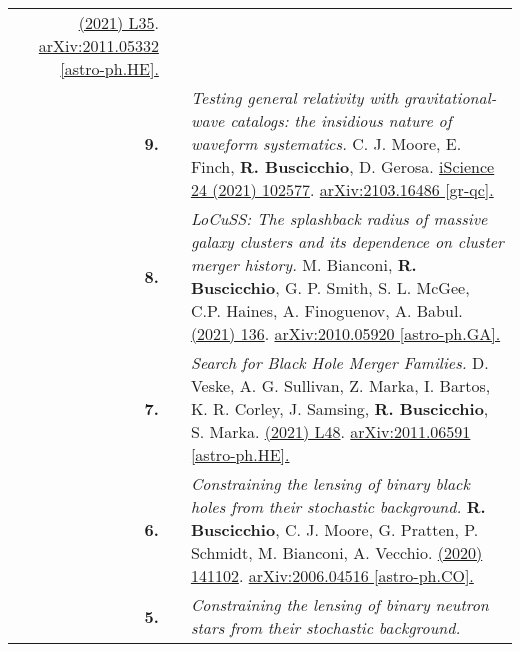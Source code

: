 {\begin{longtable}{rp{0.3cm}p{15.8cm}}
\href{https://iopscience.iop.org/article/10.3847/2041-8213/ac0aef}{\apjl 915 (2021) L35}. \href{https://arxiv.org/abs/2011.05332}{arXiv:2011.05332 [astro-ph.HE].}
\vspace{0.09cm}\\
%
\textbf{9.} & & \textit{Testing general relativity with gravitational-wave catalogs: the insidious nature of waveform systematics.}
\newline{}
C. J. Moore, E. Finch, \textbf{R. Buscicchio}, D. Gerosa.
\newline{}
\href{https://www.sciencedirect.com/science/article/pii/S2589004221005459}{iScience 24 (2021) 102577}. \href{https://arxiv.org/abs/2103.16486}{arXiv:2103.16486   [gr-qc].}
\vspace{0.09cm}\\
%
\textbf{8.} & & \textit{LoCuSS: The splashback radius of massive galaxy clusters and its dependence on cluster merger history.}
\newline{}
M. Bianconi, \textbf{R. Buscicchio}, G. P. Smith, S. L. McGee, C.P. Haines, A. Finoguenov, A. Babul.
\newline{}
\href{https://iopscience.iop.org/article/10.3847/1538-4357/abebd7}{\apj 911 (2021) 136}. \href{https://arxiv.org/abs/2010.05920}{arXiv:2010.05920 [astro-ph.GA].}
\vspace{0.09cm}\\
%
\textbf{7.} & & \textit{Search for Black Hole Merger Families.}
\newline{}
D. Veske, A. G. Sullivan, Z. Marka, I. Bartos, K. R. Corley, J. Samsing, \textbf{R. Buscicchio}, S. Marka.
\newline{}
\href{https://iopscience.iop.org/article/10.3847/2041-8213/abd721}{\apjl 907 (2021) L48}. \href{https://arxiv.org/abs/2011.06591}{arXiv:2011.06591 [astro-ph.HE].}
\vspace{0.09cm}\\
%
\textbf{6.} & & \textit{Constraining the lensing of binary black holes from their stochastic background.}
\newline{}
\textbf{R. Buscicchio}, C. J. Moore, G. Pratten, P. Schmidt, M. Bianconi, A. Vecchio.
\newline{}
\href{https://journals.aps.org/prl/abstract/10.1103/PhysRevLett.125.141102}{\prl 125 (2020) 141102}. \href{https://arxiv.org/abs/2006.04516}{arXiv:2006.04516 [astro-ph.CO].}
\vspace{0.09cm}\\
%
\textbf{5.} & & \textit{Constraining the lensing of binary neutron stars from their stochastic background.}

\end{longtable}}
